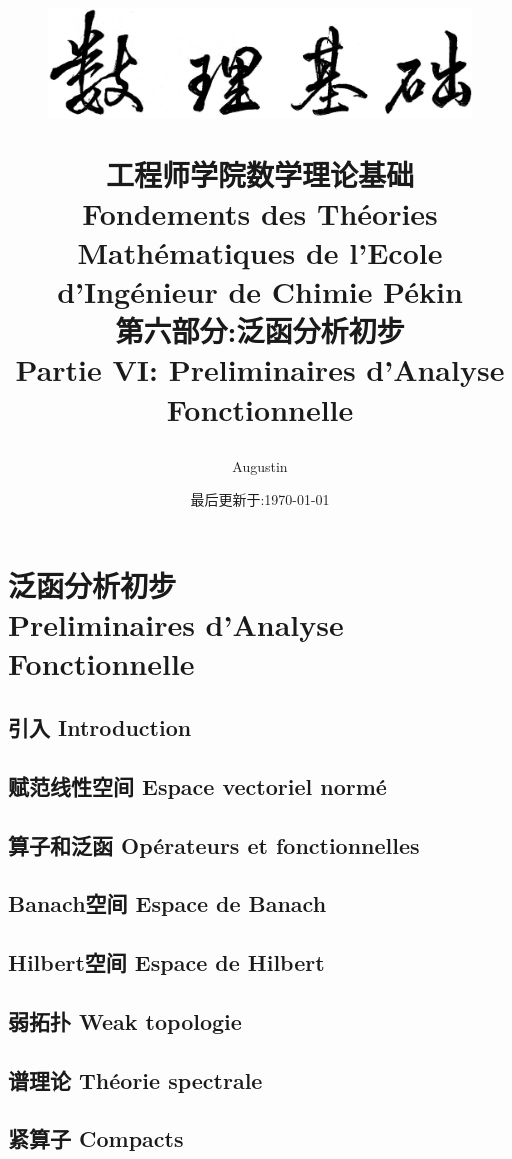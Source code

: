 \documentclass[12pt, a4paper, oneside]{ctexbook}
\title{
\vspace{-2cm}
  \begin{figure}[!t]%
    \centering
    \includegraphics[width=14cm]{shulijichu-2.png}
  \end{figure}
  \vspace{-2cm}
  {\Huge{\textbf{工程师学院数学理论基础\\
Fondements des Théories Mathématiques de l'Ecole d'Ingénieur de Chimie Pékin\\
第六部分:泛函分析初步\\
Partie VI: Preliminaires d'Analyse Fonctionnelle
}}}
}
\author{Augustin}
\date{最后更新于:\today}
\begin{document}
\vspace{-3cm}
\maketitle
\tableofcontents
\else
\part{泛函分析初步 \\Preliminaires d'Analyse Fonctionnelle}
\fi
\chapter{引入 Introduction}
\chapter{赋范线性空间 Espace vectoriel normé}
\chapter{算子和泛函 Opérateurs et fonctionnelles}
\chapter{Banach空间 Espace de Banach}
\chapter{Hilbert空间 Espace de Hilbert}
\chapter{弱拓扑 Weak topologie}
\chapter{谱理论 Théorie spectrale}
\chapter{紧算子 Compacts}







\ifx\allfiles\undefined
\end{document}
